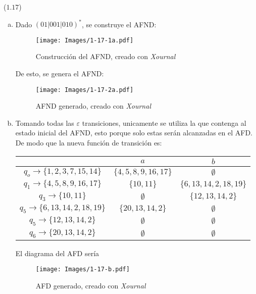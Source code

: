 \begin{mdframed}[style = warning]
	\begin{problem}
		($1.17$) 	
		\begin{enumerate}[a)]
			\item Dado $(01|001|010)^*$, se construye el AFND:
				\begin{figure}[H]
					\centering
					\texttt{[image: Images/1-17-1a.pdf]}
					\caption{Construcción del AFND, creado con \textit{Xournal}}
					\label{17-1a}
				\end{figure}
			De esto, se genera el AFND:
				\begin{figure}[H]
					\centering
					\texttt{[image: Images/1-17-2a.pdf]}
					\caption{AFND generado, creado con \textit{Xournal}}
					\label{17-2a}
				\end{figure}
			\item Tomando todas las $\varepsilon$ transiciones, unicamente se utiliza la que contenga al estado inicial del AFND, esto porque solo estas serán alcanzadas en el AFD. De modo que la nueva función de transición es:
				\begin{table}[H]
					\centering
					\begin{tabular}{c|cc}
						 & $a$ & $b$ \\
						\hline
						$q_o \to \{ 1,2,3,7,15,14 \}$ & $\{ 4,5,8,9,16,17 \}$ & $\emptyset$ \\
						$q_1 \to \{ 4,5,8,9,16,17 \}$ & $\{ 10,11 \}$ & $\{ 6,13,14,2,18,19 \}$ \\
						$q_3 \to \{ 10,11 \}$ & $\emptyset$ & $\{ 12,13,14,2 \}$ \\
						$q_5 \to \{ 6,13,14,2,18,19 \}$ & $\{ 20,13,14,2 \}$ & $\emptyset$ \\
						$q_5 \to \{ 12,13,14,2 \}$ & $\emptyset$ & $\emptyset$ \\
						$q_6 \to \{ 20,13,14,2 \}$ & $\emptyset$ & $\emptyset$ 
					\end{tabular}
				\end{table}
			El diagrama del AFD sería
				\begin{figure}[H]
					\centering
					\texttt{[image: Images/1-17-b.pdf]}
					\caption{AFD generado, creado con \textit{Xournal}}
					\label{17-b}
				\end{figure}
		\end{enumerate}		 
	\end{problem}
\end{mdframed}










